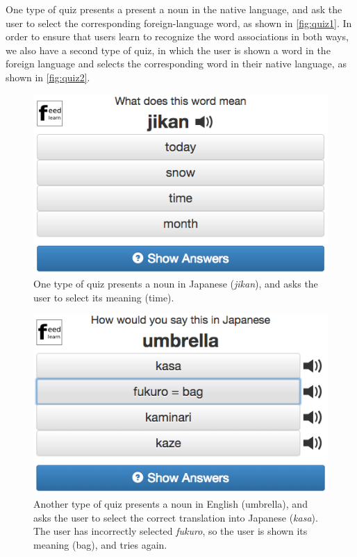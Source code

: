 \documentclass{chi-ext}
\begin{document}
One type of quiz presents a present a noun in the native language, and ask the user to select the corresponding foreign-language word, as shown in \autoref{fig:quiz1}. In order to ensure that users learn to recognize the word associations in both ways, we also have a second type of quiz, in which the user is shown a word in the foreign language and selects the corresponding word in their native language, as shown in \autoref{fig:quiz2}.

\begin{figure}
\centering
\includegraphics[width=1.0\columnwidth]{quiz1}
\caption{One type of quiz presents a noun in Japanese (\textit{jikan}), and asks the user to select its meaning (time).}
\label{fig:quiz1}
\end{figure}

\begin{figure}
\centering
\includegraphics[width=1.0\columnwidth]{quiz2}
\caption{Another type of quiz presents a noun in English (umbrella), and asks the user to select the correct translation into Japanese (\textit{kasa}). The user has incorrectly selected \textit{fukuro}, so the user is shown its meaning (bag), and tries again.}
\label{fig:quiz2}
\end{figure}
\end{document}
